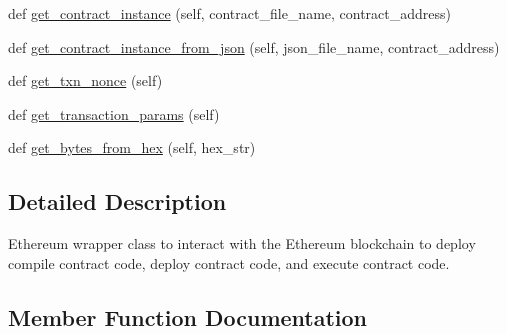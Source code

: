 \begin{DoxyCompactItemize}
\item 
def \hyperlink{classavalon__sdk_1_1connector_1_1blockchains_1_1ethereum_1_1ethereum__wrapper_1_1EthereumWrapper_a6e299ebe91c997f7a053850b6609315c}{get\+\_\+contract\+\_\+instance} (self, contract\+\_\+file\+\_\+name, contract\+\_\+address)
\item 
def \hyperlink{classavalon__sdk_1_1connector_1_1blockchains_1_1ethereum_1_1ethereum__wrapper_1_1EthereumWrapper_aaacb356300dea555bd7d2c499e4a176f}{get\+\_\+contract\+\_\+instance\+\_\+from\+\_\+json} (self, json\+\_\+file\+\_\+name, contract\+\_\+address)
\item 
def \hyperlink{classavalon__sdk_1_1connector_1_1blockchains_1_1ethereum_1_1ethereum__wrapper_1_1EthereumWrapper_a0bdd6ccaa61f24f73843d9f8b6f16ee4}{get\+\_\+txn\+\_\+nonce} (self)
\item 
def \hyperlink{classavalon__sdk_1_1connector_1_1blockchains_1_1ethereum_1_1ethereum__wrapper_1_1EthereumWrapper_a872242f5294bb4e4c132af1cd7b3de80}{get\+\_\+transaction\+\_\+params} (self)
\item 
def \hyperlink{classavalon__sdk_1_1connector_1_1blockchains_1_1ethereum_1_1ethereum__wrapper_1_1EthereumWrapper_a6e651a98e5e98adb1ca8b790e8909613}{get\+\_\+bytes\+\_\+from\+\_\+hex} (self, hex\+\_\+str)
\end{DoxyCompactItemize}


\subsection{Detailed Description}
\begin{DoxyVerb}Ethereum wrapper class to interact with the Ethereum blockchain to
deploy compile contract code, deploy contract code,
and execute contract code.
\end{DoxyVerb}
 

\subsection{Member Function Documentation}
\mbox{\label{classavalon__sdk_1_1connector_1_1blockchains_1_1ethereum_1_1ethereum__wrapper_1_1EthereumWrapper_ab221f5782ede84450eb84631d2047b6d}} 
